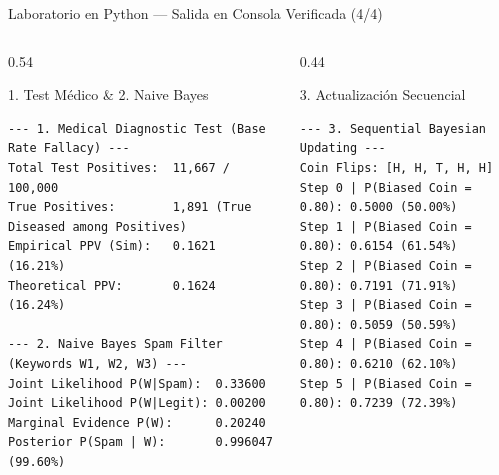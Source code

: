\documentclass[10pt, aspectratio=169]{beamer}
\begin{document}
\begin{frame}[fragile]{Laboratorio en Python --- Salida en Consola Verificada (4/4)}
  \vspace{-0.1cm}
  \begin{columns}[T]
    \begin{column}{0.54\textwidth}
      \begin{block}{1. Test Médico \& 2. Naive Bayes}
        \fontsize{4.4pt}{5.2pt}\selectfont
\begin{verbatim}
--- 1. Medical Diagnostic Test (Base Rate Fallacy) ---
Total Test Positives:  11,667 / 100,000
True Positives:        1,891 (True Diseased among Positives)
Empirical PPV (Sim):   0.1621 (16.21%)
Theoretical PPV:       0.1624 (16.24%)

--- 2. Naive Bayes Spam Filter (Keywords W1, W2, W3) ---
Joint Likelihood P(W|Spam):  0.33600
Joint Likelihood P(W|Legit): 0.00200
Marginal Evidence P(W):      0.20240
Posterior P(Spam | W):       0.996047 (99.60%)
\end{verbatim}
      \end{block}
    \end{column}
    \begin{column}{0.44\textwidth}
      \begin{block}{3. Actualización Secuencial}
        \fontsize{4.4pt}{5.2pt}\selectfont
\begin{verbatim}
--- 3. Sequential Bayesian Updating ---
Coin Flips: [H, H, T, H, H]
Step 0 | P(Biased Coin = 0.80): 0.5000 (50.00%)
Step 1 | P(Biased Coin = 0.80): 0.6154 (61.54%)
Step 2 | P(Biased Coin = 0.80): 0.7191 (71.91%)
Step 3 | P(Biased Coin = 0.80): 0.5059 (50.59%)
Step 4 | P(Biased Coin = 0.80): 0.6210 (62.10%)
Step 5 | P(Biased Coin = 0.80): 0.7239 (72.39%)
\end{verbatim}
      \end{block}
    \end{column}
  \end{columns}
\end{frame}
\end{document}
